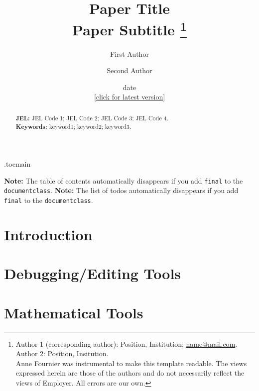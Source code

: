 \documentclass[11 pt]{article}
\title{Paper Title  \\
	Paper Subtitle%
\thanks{%
Author 1 (corresponding author): Position, Institution; \url{name@mail.com}. 
Author 2: Position, Insitution. \\[1ex]
\noindent
Anne Fournier was instrumental to make this template readable. The views expressed herein are those of the authors and do not necessarily reflect the views of Employer. All errors are our own.
}}
\author{%
	\large First Author  \and
	\large Second Author
	}
\date{
	date \\
	\small{[\href{http://paper.website.com}{click for latest version}]}
}
\begin{document}
\etocdepthtag.toc{main}


\maketitle
\thispagestyle{empty}
\vspace{-4ex}
\begin{abstract}



\vspace{4ex}
\noindent \textbf{JEL: }JEL Code 1; JEL Code 2; JEL Code 3; JEL Code 4. \\
\noindent \textbf{Keywords:} keyword1; keyword2; keyword3.
\end{abstract}
\newpage

\ifoptionfinal
{}%
{
\noindent
\textbf{Note:} The table of contents automatically disappears if you add \texttt{final} to the \texttt{documentclass}.
\tableofcontents
\thispagestyle{empty}
\newpage
\noindent
\textbf{Note:} The list of todos automatically disappears if you add \texttt{final} to the \texttt{documentclass}.
\listoftodos
\thispagestyle{empty}
\newpage
}




\setcounter{page}{1}


\section{Introduction}


\section{Debugging/Editing Tools}


\section{Mathematical Tools}


\newpage
\singlespacing



\newpage
{}

\end{document}
